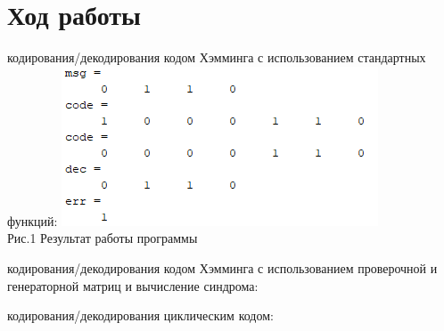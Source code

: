 \documentclass[a4paper,12pt]{article}
\begin{document}
\section{Ход работы}
\begin{enumerate}
	{ кодирования/декодирования кодом Хэмминга с использованием стандартных функций:
		{\center\includegraphics{./pictures/1.png} \\ Рис.1 Результат работы программы}
		\\}
	
	{ кодирования/декодирования кодом Хэмминга с использованием проверочной и генераторной матриц и вычисление синдрома:
		\\}
	
	{ кодирования/декодирования циклическим кодом:
		\\}
	

\end{enumerate}
\end{document}

